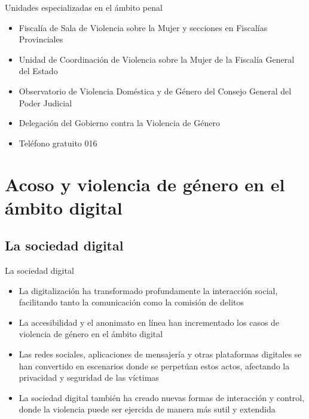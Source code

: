 \documentclass{beamer}
\begin{document}
    \begin{frame}{Unidades especializadas en el ámbito penal}
        \begin{itemize}
            \item Fiscalía de Sala de Violencia sobre la Mujer y secciones en Fiscalías Provinciales
            \item Unidad de Coordinación de Violencia sobre la Mujer de la Fiscalía General del Estado
            \item Observatorio de Violencia Doméstica y de Género del Consejo General del Poder Judicial
            \item Delegación del Gobierno contra la Violencia de Género
            \item Teléfono gratuito 016
        \end{itemize}
    \end{frame}


    \section{Acoso y violencia de género en el ámbito digital}

    \subsection{La sociedad digital}
    \begin{frame}{La sociedad digital}
        \begin{itemize}
            \item La digitalización ha transformado profundamente la interacción social, facilitando tanto la comunicación como la comisión de delitos
            \item La accesibilidad y el anonimato en línea han incrementado los casos de violencia de género en el ámbito digital
            \item Las redes sociales, aplicaciones de mensajería y otras plataformas digitales se han convertido en escenarios donde se perpetúan estos actos, afectando la privacidad y seguridad de las víctimas
            \item La sociedad digital también ha creado nuevas formas de interacción y control, donde la violencia puede ser ejercida de manera más sutil y extendida
        \end{itemize}
    \end{frame}
\end{document}

